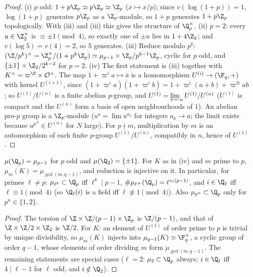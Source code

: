 \begin{proof}
(i) $p$ odd: $1+p\Z_p\simeq p\Z_p\simeq\Z_p$ ($x\mapsto x/p$); since $v(\log(1+p))=1$, $\log(1+p)$ generates $p\Z_p$ as a $\Z_p$-module, so $1+p$
generates $1+p\Z_p$ topologically. With (iii) and (iii) this gives the structure of $\Q_p^\times$.
(ii) $p=2$: every $u\in\Z_2^\times$ is $\equiv\pm1\pmod4$, so exactly one of $\pm u$ lies in $1+4\Z_2$; and $v(\log5)=v(4)=2$, so $5$ generates.
(iii) Reduce modulo $p^k$: $(\Z/p^k)^\times=\Z_p^\times/(1+p^k\Z_p)\simeq\mu_{p-1}\times\Z_p/p^{k-1}\Z_p$, cyclic for $p$ odd, and $\{\pm1\}\times\Z_2/2^{k-2}$ for $p=2$.
(iv) The first statement is (iii) together with $K^\times=\varpi^{\Z}\times\mathcal O^\times$. The map
$1+\varpi^ia\mapsto\bar a$ is a homomorphism $U^{(i)}\to(\F_q,+)$ with kernel $U^{(i+1)}$, since $(1+\varpi^ia)(1+\varpi^ib)=1+\varpi^i(a+b)+\varpi^{2i}ab$; so
$U^{(1)}/U^{(n)}$ is a finite abelian $p$-group, and $U^{(1)}=\varprojlim_nU^{(1)}/U^{(n)}$ ($U^{(1)}$ is compact and the $U^{(n)}$ form a basis of open
neighbourhoods of $1$). An abelian pro-$p$ group is a $\Z_p$-module ($u^a=\lim u^{a_k}$ for integers $a_k\to a$; the limit exists because
$u^{p^N}\in U^{(n)}$ for $N$ large). For $p\nmid m$, multiplication by $m$ is an automorphism of each finite $p$-group $U^{(1)}/U^{(n)}$, compatibly in
$n$, hence of $U^{(1)}$.
\end{proof}

\begin{corollary}\label{cor:local:roots-of-unity}
$\mu(\Q_p)=\mu_{p-1}$ for $p$ odd and $\mu(\Q_2)=\{\pm1\}$. For $K$ as in (iv) and $m$ prime to $p$,
$\mu_m(K)=\mu_{\gcd(m,q-1)}$, and reduction is injective on it. In particular, for primes $\ell\ne p$: $\mu_{\ell^k}\subset\Q_p$ iff
$\ell^k\mid p-1$, $\#\mu_{\ell^\infty}(\Q_p)=\ell^{v_\ell(p-1)}$, and $i\in\Q_\ell$ iff $\ell\equiv1\pmod4$ (so $\Q_\ell(i)$ is a field iff
$\ell\not\equiv1\pmod4$). Also $\mu_{p^n}\subset\Q_p$ only for $p^n\in\{1,2\}$.
\end{corollary}

\begin{proof}
The torsion of $\Z\times\Z/(p-1)\times\Z_p$ is $\Z/(p-1)$, and that of $\Z\times\Z/2\times\Z_2$ is $\Z/2$. For $K$: an element of $U^{(1)}$ of order
prime to $p$ is trivial by unique divisibility, so $\mu_m(K)$ injects into $\mu_{q-1}(K)\simeq\F_q^\times$, a cyclic group of order $q-1$, whose
elements of order dividing $m$ form $\mu_{\gcd(m,q-1)}$. The remaining statements are special cases ($\ell=2$: $\mu_2\subset\Q_p$ always;
$i\in\Q_\ell$ iff $4\mid\ell-1$ for $\ell$ odd, and $i\notin\Q_2$).
\end{proof}

